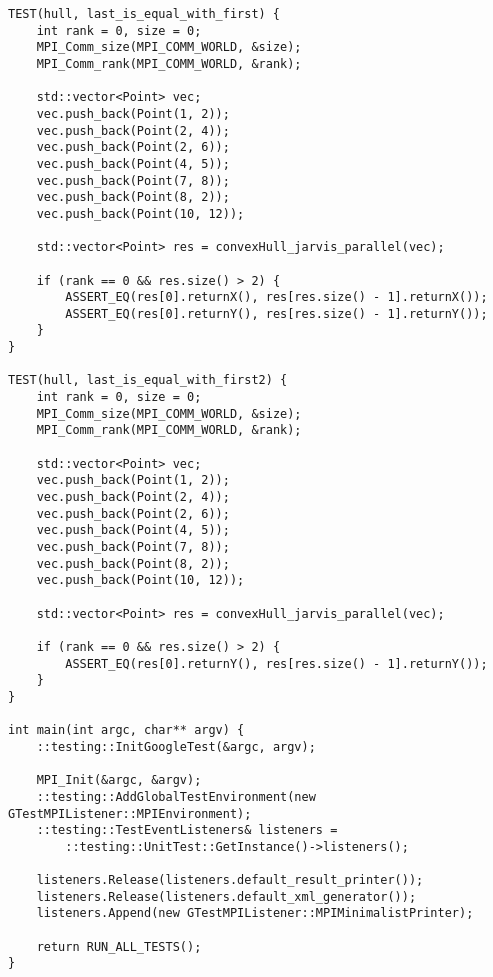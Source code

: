 \documentclass{report}
\begin{document}
\begin{lstlisting}
TEST(hull, last_is_equal_with_first) {
    int rank = 0, size = 0;
    MPI_Comm_size(MPI_COMM_WORLD, &size);
    MPI_Comm_rank(MPI_COMM_WORLD, &rank);

    std::vector<Point> vec;
    vec.push_back(Point(1, 2));
    vec.push_back(Point(2, 4));
    vec.push_back(Point(2, 6));
    vec.push_back(Point(4, 5));
    vec.push_back(Point(7, 8));
    vec.push_back(Point(8, 2));
    vec.push_back(Point(10, 12));

    std::vector<Point> res = convexHull_jarvis_parallel(vec);

    if (rank == 0 && res.size() > 2) {
        ASSERT_EQ(res[0].returnX(), res[res.size() - 1].returnX());
        ASSERT_EQ(res[0].returnY(), res[res.size() - 1].returnY());
    }
}

TEST(hull, last_is_equal_with_first2) {
    int rank = 0, size = 0;
    MPI_Comm_size(MPI_COMM_WORLD, &size);
    MPI_Comm_rank(MPI_COMM_WORLD, &rank);

    std::vector<Point> vec;
    vec.push_back(Point(1, 2));
    vec.push_back(Point(2, 4));
    vec.push_back(Point(2, 6));
    vec.push_back(Point(4, 5));
    vec.push_back(Point(7, 8));
    vec.push_back(Point(8, 2));
    vec.push_back(Point(10, 12));

    std::vector<Point> res = convexHull_jarvis_parallel(vec);

    if (rank == 0 && res.size() > 2) {
        ASSERT_EQ(res[0].returnY(), res[res.size() - 1].returnY());
    }
}

int main(int argc, char** argv) {
    ::testing::InitGoogleTest(&argc, argv);

    MPI_Init(&argc, &argv);
    ::testing::AddGlobalTestEnvironment(new GTestMPIListener::MPIEnvironment);
    ::testing::TestEventListeners& listeners =
        ::testing::UnitTest::GetInstance()->listeners();

    listeners.Release(listeners.default_result_printer());
    listeners.Release(listeners.default_xml_generator());
    listeners.Append(new GTestMPIListener::MPIMinimalistPrinter);

    return RUN_ALL_TESTS();
}

\end{lstlisting}
\end{document}
